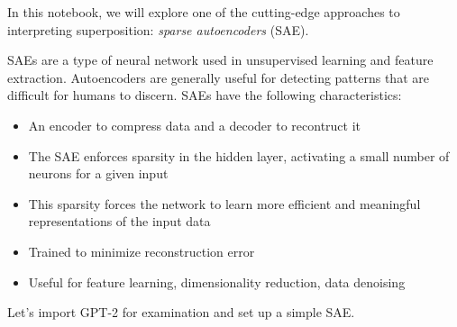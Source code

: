 \documentclass[
  letterpaper,
  DIV=11,
  numbers=noendperiod]{scrreprt}
\providecommand{\tightlist}{%
  \setlength{\itemsep}{0pt}\setlength{\parskip}{0pt}}\usepackage{longtable,booktabs,array}
\begin{document}
In this notebook, we will explore one of the cutting-edge approaches to
interpreting superposition: \emph{sparse autoencoders} (SAE).

SAEs are a type of neural network used in unsupervised learning and
feature extraction. Autoencoders are generally useful for detecting
patterns that are difficult for humans to discern. SAEs have the
following characteristics:

\begin{itemize}
\tightlist
\item
  An encoder to compress data and a decoder to recontruct it
\item
  The SAE enforces sparsity in the hidden layer, activating a small
  number of neurons for a given input
\item
  This sparsity forces the network to learn more efficient and
  meaningful representations of the input data
\item
  Trained to minimize reconstruction error
\item
  Useful for feature learning, dimensionality reduction, data denoising
\end{itemize}

Let's import GPT-2 for examination and set up a simple SAE.
\end{document}
